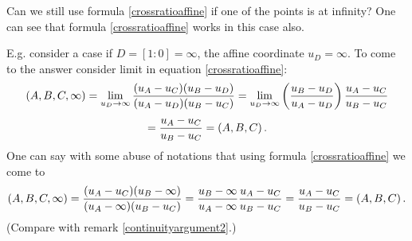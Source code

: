 \documentclass[12pt]{article}
\numberwithin{equation}{section}
\begin{document}



Can we still use formula 
\eqref{crossratioaffine} if one of the points is at infinity?     
One can see that formula \eqref{crossratioaffine}
works in this case also.



E.g. consider a case if $D=[1:0]=\infty$, the affine coordinate
$u_D=\infty$.
  To come to the answer 
consider limit in equation \eqref{crossratioaffine}:
      $$
(A,B,C,\infty)=\lim_{u_D\to \infty}{
        (u_A-u_C)(u_B-u_D)
        \over
       (u_A-u_D)(u_B-u_C)
          }=  \lim_{u_D\to \infty}
             \left(
               {
        u_B-u_D
        \over
       u_A-u_D
          }
          \right)     
            {
        u_A-u_C
        \over
       u_B-u_C
          }
         $$       
             \begin{equation}\label{ratioisequalcrossratio}        
          = {
        u_A-u_C
        \over
       u_B-u_C
          }=(A,B,C)\,.
\end{equation}
One can say with some abuse of notations that
using formula \eqref{crossratioaffine} we come to
  \begin{equation}\label{limitofcrossratio}
(A,B,C,\infty)=
            {
        (u_A-u_C)(u_B-\infty)
        \over
       (u_A-\infty)(u_B-u_C)
          }=             
          {u_B-\infty\over u_A-\infty}
            {
        u_A-u_C
        \over
       u_B-u_C
          }= 
            {
        u_A-u_C
        \over
       u_B-u_C
          }=(A,B,C)\,.
  \end{equation}
   (Compare with remark \eqref{continuityargument2}.)
\end{document}
